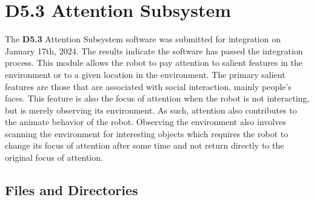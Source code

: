 \documentclass{CSSRforAfrica}
\begin{document}
  
%  




\newpage
\section{D5.3 Attention Subsystem} 
\label{section:overt_attention}
The \textbf{D5.3} Attention Subsystem software was submitted for integration on January 17th, 2024. The results indicate the software has passed the integration process. This module allows the robot to pay attention to salient features in the environment or to a given location in the environment. The primary salient features are those that are associated with social interaction, mainly people’s faces. This feature is also the focus of attention when the robot is not interacting, but is merely observing its environment. As such, attention also contributes to the animate behavior of the robot. Observing the environment also involves scanning the environment for interesting objects which requires the robot to change its focus of attention after some time and not return directly to the original focus of attention.

\subsection{Files and Directories}
 
\end{document}
